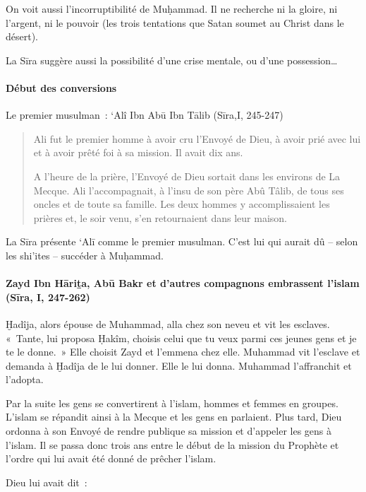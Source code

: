 On voit aussi l'incorruptibilité de Muḥammad. Il ne recherche ni la
gloire, ni l'argent, ni le pouvoir (les trois tentations que Satan
soumet au Christ dans le désert).

La Sīra suggère aussi la possibilité d'une crise mentale, ou d'une
possession\ldots{}


\paragraph{Début des conversions}

Le premier musulman~: `Alî Ibn Abū Ibn Tālib (Sīra,I, 245-247)

\begin{quote}

{Ali fut le premier homme à avoir cru l'Envoyé de Dieu, à avoir
prié avec lui et à avoir prêté foi à sa mission. Il avait dix ans.}

{A l'heure de la prière, l'Envoyé de Dieu sortait dans les environs
de La Mecque. Ali l'accompagnait, à l'insu de son père Abû Tâlib, de
tous ses oncles et de toute sa famille. Les deux hommes y
accomplissaient les prières et, le soir venu, s'en retournaient dans
leur maison.}
    
\end{quote}
La Sīra présente `Alī comme le premier musulman. C'est lui qui aurait dû
-- selon les shi'ites -- succéder à Muḥammad.


\paragraph{Zayd Ibn Hāriṯa, Abū Bakr et d'autres compagnons
embrassent l'islam (Sīra, I,
247-262)}

Ḫadîja, alors épouse de Muhammad, alla chez son neveu et vit les
esclaves. «~Tante, lui proposa Ḥakîm, choisis celui que tu veux parmi
ces jeunes gens et je te le donne.~» Elle choisit Zayd et l'emmena chez
elle. Muhammad vit l'esclave et demanda à Ḫadîja de le lui donner. Elle
le lui donna. Muhammad l'affranchit et l'adopta.

Par la suite les gens se convertirent à l'islam, hommes et femmes en
groupes. L'islam se répandit ainsi à la Mecque et les gens en parlaient.
Plus tard, Dieu ordonna à son Envoyé de rendre publique sa mission et
d'appeler les gens à l'islam. Il se passa donc trois ans entre le début
de la mission du Prophète et l'ordre qui lui avait été donné de prêcher
l'islam.

{Dieu lui avait dit~:}


